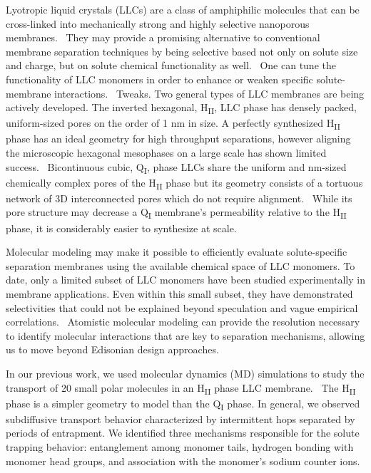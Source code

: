 \documentclass{article}
\begin{document}
  Lyotropic liquid crystals (LLCs) are a class of amphiphilic molecules that can be 
  cross-linked into mechanically strong and highly selective nanoporous membranes.~\cite{gin_polymerized_2008}
  They may provide a promising alternative to 
  conventional membrane separation techniques by being selective based not only on solute
  size and charge, but on solute chemical functionality as well.~\cite{dischinger_application_2017}
  One can tune the functionality of LLC monomers
  in order to enhance or weaken specific solute-membrane interactions.~\cite{dischinger_effect_2017}
  Tweaks.
  Two
  general types of LLC membranes 
  are 
  being actively developed.
  The inverted hexagonal, 
  H\textsubscript{II}, LLC phase has densely packed, uniform-sized pores on the order of 1 nm
  in size. A perfectly synthesized H\textsubscript{II} phase has an ideal geometry for high
  throughput separations, however aligning the microscopic hexagonal mesophases on a large 
  scale has shown limited success.~\cite{feng_scalable_2014,feng_thin_2016} Bicontinuous cubic,
  Q\textsubscript{I}, phase LLCs share the uniform and nm-sized chemically complex pores of
  the H\textsubscript{II} phase but its geometry consists of a tortuous network of 3D 
  interconnected pores which do not require alignment.~\cite{carter_glycerol-based_2012} While 
  its pore structure may decrease a Q\textsubscript{I} membrane's permeability relative to the
  H\textsubscript{II} phase, it is considerably easier to synthesize at scale.
  
  Molecular modeling may make it possible to efficiently evaluate solute-specific separation
  membranes using the available chemical space of LLC monomers. To date, only a limited 
  subset of LLC monomers have been studied experimentally in membrane applications.
  \cite{carter_glycerol-based_2012,hatakeyama_nanoporous_2010,smith_ordered_1997,zhou_assembly_2003,resel_structural_2000}
  Even within this small subset, they have demonstrated selectivities that could not be
  explained beyond speculation and vague empirical correlations.~\cite{dischinger_application_2017}
  Atomistic molecular modeling can provide the resolution necessary to identify molecular 
  interactions that are key to separation mechanisms, allowing us to move beyond 
  Edisonian design approaches.

  In our previous work, we used molecular dynamics (MD) simulations to study the transport
  of 20 small polar molecules in an H\textsubscript{II} phase LLC membrane.~\cite{coscia_chemically_2019}
  The H\textsubscript{II} phase is a simpler geometry to model than the Q\textsubscript{I} phase.  
  In general, we observed subdiffusive transport behavior characterized by intermittent hops 
  separated by periods of entrapment. We identified three mechanisms responsible for the 
  solute trapping behavior: entanglement among monomer tails, hydrogen bonding with monomer
  head groups, and association with the monomer's sodium counter ions.
  
\end{document}
